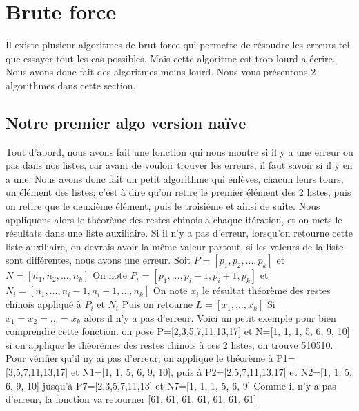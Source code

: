 \documentclass[a4paper, 11pt]{article}
\begin{document}
\section{Brute force}
Il existe plusieur algoritmes de brut force qui permette de résoudre les erreurs tel que essayer tout les cas possibles. Mais cette algoritme est trop lourd a écrire. Nous avons donc fait des algoritmes moins lourd.
Nous vous présentons 2 algorithmes dans cette section.
\subsection{Notre premier algo version naïve }
Tout d'abord, nous avons fait une fonction qui nous montre si il y a une erreur ou pas dans nos listes, car avant de vouloir trouver les erreurs, il faut savoir si il y en a une.
Nous avons donc fait un petit algorithme qui enlèves, chacun leurs tours, un élément des listes; c'est à dire qu'on retire le premier élément des 2 listes, puis on retire que le deuxième élément, puis le troisième et ainsi de suite. Nous appliquons alors le théorème des restes chinois a chaque itération, et on mets le résultats dans une liste auxiliaire. Si il n'y a pas d'erreur,
lorsqu'on retourne cette liste auxiliaire, on devrais avoir la même valeur partout, si les valeurs de la liste sont différentes, nous avons une erreur. \newline
\newline
Soit $P=[p_1 , p_2, ... , p_k]$ et $N=[n_1, n_2, ..., n_k]$ \newline
On note $P_i = [p_1,..., p_i-1, p_i+1, p_k]$ et $N_i=[n_1,..., n_i-1, n_i+1, ... , n_k]$ \newline
On note $x_i$ le résultat théorème des restes chinois appliqué à $P_i$ et $N_i$ \newline
Puis on retourne 
$L=[x_1, ..., x_k]$ \newline
Si 
$x_1=x_2=...=x_k$ 
alors il n'y a pas d'erreur.
\newline
Voici un petit exemple pour bien comprendre cette fonction.\newline
on pose P=[2,3,5,7,11,13,17] et N=[1, 1, 1, 5, 6, 9, 10] \newline
si on applique le théorèmes des restes chinois à ces 2 listes, on trouve 510510. Pour vérifier qu'il ny ai pas d'erreur, on applique le théorème à
P1=[3,5,7,11,13,17] et N1=[1, 1, 5, 6, 9, 10], puis à P2=[2,5,7,11,13,17] et N2=[1, 1, 5, 6, 9, 10] jusqu'à P7=[2,3,5,7,11,13] et N7=[1, 1, 1, 5, 6, 9]\newline
Comme il n'y a pas d'erreur, la fonction va retourner [61, 61, 61, 61, 61, 61, 61] \newline
\end{document}
